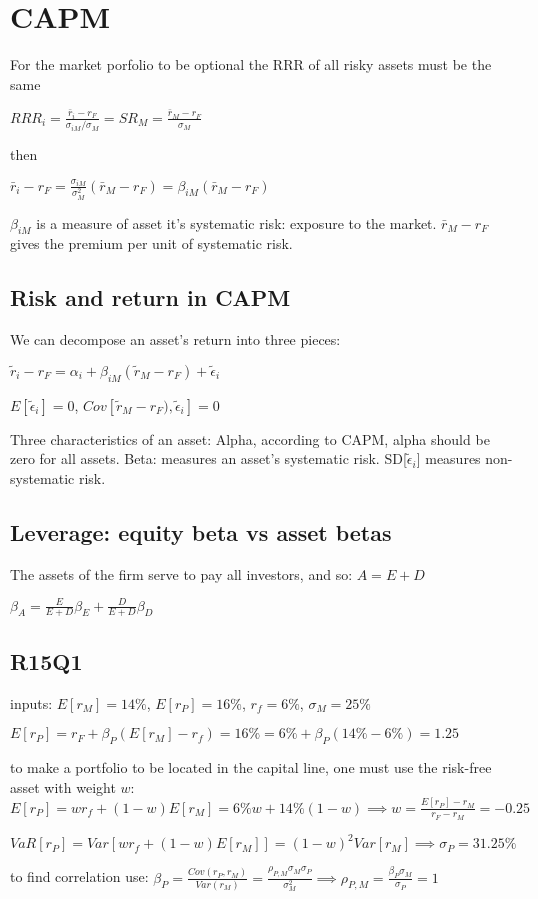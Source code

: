 \section{CAPM}

For the market porfolio to be optional the RRR of all risky assets must be the same

$RRR_i = \frac{\bar{r}_i-r_F}{\sigma_{iM}/ \sigma_M} = SR_M = \frac{\bar{r}_M-r_F}{\sigma_M}$

then

$ \bar{r}_i-r_F = \frac{\sigma_{iM}}{\sigma_M^2} (\bar{r}_M-r_F)  = \beta_{iM} (\bar{r}_M-r_F) $

$\beta_{iM}$ is a measure of asset it's systematic risk: exposure to the market.
$\bar{r}_M-r_F$ gives the premium per unit of systematic risk.

\subsection*{Risk and return in CAPM}
We can decompose an asset’s return into three pieces:


$ \tilde{r}_i-r_F = \alpha_i + \beta_{iM} (\tilde{r}_M-r_F) + \tilde{\epsilon}_i$

$E[\tilde{\epsilon}_i]=0$, $Cov[\tilde{r}_M-r_F) , \tilde{\epsilon}_i]=0$

Three characteristics of an asset: Alpha, according to CAPM, alpha should be zero for all assets. Beta: measures an asset’s systematic risk. SD[$\tilde{\epsilon}_i$] measures non-systematic risk.

\subsection*{Leverage: equity beta vs asset betas}

The assets of the firm serve to pay all investors, and so:
$A=E+D$

$\beta_A = \frac{E}{E+D} \beta_E + \frac{D}{E+D} \beta_D$


\subsection*{R15Q1}
inputs: $E[r_M]=14\%$, $E[r_P]=16\%$, $r_f=6\%$, $\sigma_M=25\%$

$E[r_P] = r_F + \beta_P (E[r_M]-r_f) = 16\% = 6\% + \beta_P (14\% - 6\%) =1.25$

to make a portfolio to be located in the capital line, one must use the risk-free asset with weight $w$:
 $E[r_P]=w r_f + (1-w) E[r_M] = 6\%w+14\%(1-w) \implies w=\frac{E[r_P]-r_M}{r_F-r_M}=-0.25$
 
$VaR[r_P] = Var[w r_f + (1-w) E[r_M]] = (1-w)^2 Var[r_M] \implies \sigma_P = 31.25\% $ 

to find correlation use: 
$\beta_P = \frac{Cov(r_P, r_M)}{Var(r_M)}=\frac{\rho_{P,M} \sigma_M \sigma_P }{\sigma_M^2} \implies \rho_{P,M}=\frac{\beta_P \sigma_M}{\sigma_P} = 1$
